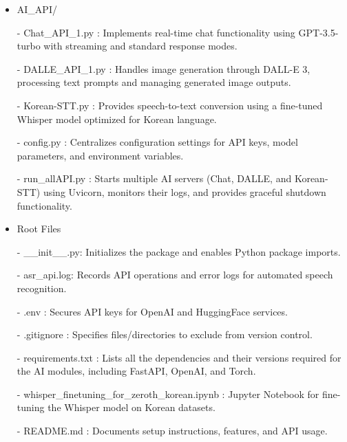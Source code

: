                 \begin{itemize}
                    \item AI\_API/
                        \item[-] Chat\_API\_1.py : Implements real-time chat functionality using GPT-3.5-turbo with streaming and standard response modes.
                        \item[-] DALLE\_API\_1.py : Handles image generation through DALL-E 3, processing text prompts and managing generated image outputs.
                        \item[-] 
                        Korean-STT.py : Provides speech-to-text conversion using a fine-tuned Whisper model optimized for Korean language.
                        \item[-] config.py : Centralizes configuration settings for API keys, model parameters, and environment variables.
                        \item[-] run\_allAPI.py : Starts multiple AI servers (Chat, DALLE, and Korean-STT) using Uvicorn, monitors their logs, and provides graceful shutdown functionality.
                    \vspace{3mm}
                    
                    \item Root Files
                        \item[-] \_\_init\_\_.py: Initializes the package and enables Python package imports.
                        \item[-] asr\_api.log: Records API operations and error logs for automated speech recognition.
                        \item[-] .env : Secures API keys for OpenAI and HuggingFace services.
                        \item[-] .gitignore : Specifies files/directories to exclude from version control.
                        \item[-] requirements.txt : Lists all the dependencies and their versions required for the AI modules, including FastAPI, OpenAI, and Torch.
                        \item[-] whisper\_finetuning\_for\_zeroth\_korean.ipynb : Jupyter Notebook for fine-tuning the Whisper model on Korean datasets.
                        \item[-] README.md : Documents setup instructions, features, and API usage.
                        

                \end{itemize}

